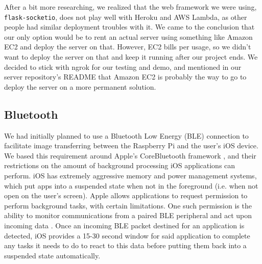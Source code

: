 \documentclass[a4paper,11pt]{article}
\begin{document}
After a bit more researching, we realized that the web framework we were using, \texttt{flask-socketio}, does not play well with Heroku and AWS Lambda, as other people had similar deployment troubles with it. We came to the conclusion that our only option would be to rent an actual server using something like Amazon EC2 \cite{aws-ec2} and deploy the server on that. However, EC2 bills per usage, so we didn't want to deploy the server on that and keep it running after our project ends. We decided to stick with ngrok for our testing and demo, and mentioned in our server repository's README that Amazon EC2 is probably the way to go to deploy the server on a more permanent solution.

\subsection{Bluetooth}
\label{bluetooth}
We had initially planned to use a Bluetooth Low Energy (BLE) connection to facilitate image transferring between the Raspberry Pi and the user's iOS device. We based this requirement around Apple's CoreBluetooth framework \cite{apple-bluetooth}, and their restrictions on the amount of background processing iOS applications can perform. iOS has extremely aggressive memory and power management systems, which put apps into a suspended state when not in the foreground (i.e. when not open on the user's screen). Apple allows applications to request permission to perform background tasks, with certain limitations. One such permission is the ability to monitor communications from a paired BLE peripheral and act upon incoming data \cite{apple-bluetooth}. Once an incoming BLE packet destined for an application is detected, iOS provides a 15-30 second window for said application to complete any tasks it needs to do to react to this data before putting them back into a suspended state automatically.
\end{document}
